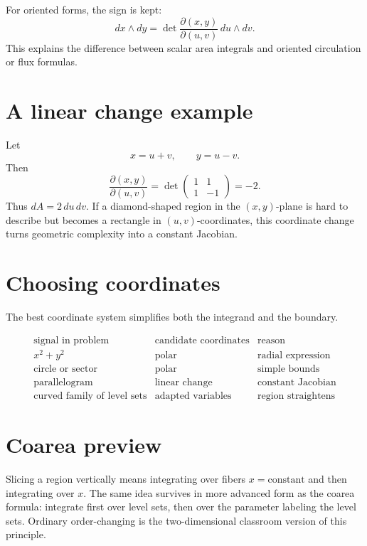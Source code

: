 For oriented forms, the sign is kept:
\[
  dx\wedge dy
  =\det\frac{\partial(x,y)}{\partial(u,v)}\,du\wedge dv.
\]
This explains the difference between scalar area integrals and oriented circulation or flux formulas.

\section{A linear change example}

\begin{example}
Let
\[
  x=u+v,\qquad y=u-v.
\]
Then
\[
  \frac{\partial(x,y)}{\partial(u,v)}=
  \det\begin{pmatrix}1&1\\1&-1\end{pmatrix}=-2.
\]
Thus \(dA=2\,du\,dv\).  If a diamond-shaped region in the \((x,y)\)-plane is hard to describe but becomes a rectangle in \((u,v)\)-coordinates, this coordinate change turns geometric complexity into a constant Jacobian.
\end{example}

\section{Choosing coordinates}

The best coordinate system simplifies both the integrand and the boundary.

\[
\begin{array}{c|c|c}
\text{signal in problem} & \text{candidate coordinates} & \text{reason}\\
\hline
x^2+y^2 & \text{polar} & \text{radial expression}\\
\text{circle or sector} & \text{polar} & \text{simple bounds}\\
\text{parallelogram} & \text{linear change} & \text{constant Jacobian}\\
\text{curved family of level sets} & \text{adapted variables} & \text{region straightens}
\end{array}
\]

\section{Coarea preview}

Slicing a region vertically means integrating over fibers \(x=\text{constant}\) and then integrating over \(x\).  The same idea survives in more advanced form as the coarea formula: integrate first over level sets, then over the parameter labeling the level sets.  Ordinary order-changing is the two-dimensional classroom version of this principle.

